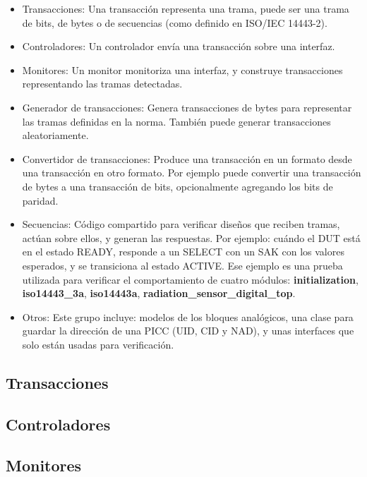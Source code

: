 \documentclass[a4paper, twoside, 11pt]{report}
\begin{document}
\begin{itemize}
  \item Transacciones: Una transacción representa una trama, puede ser una trama de bits, de bytes o de secuencias (como definido en ISO/IEC 14443-2).
  \item Controladores: Un controlador envía una transacción sobre una interfaz.
  \item Monitores: Un monitor monitoriza una interfaz, y construye transacciones representando las tramas detectadas.
  \item Generador de transacciones: Genera transacciones de bytes para representar las tramas definidas en la norma. También puede generar transacciones aleatoriamente.
  \item Convertidor de transacciones: Produce una transacción en un formato desde una transacción en otro formato. Por ejemplo puede convertir una transacción de bytes a una transacción de bits, opcionalmente agregando los bits de paridad.
  \item Secuencias: Código compartido para verificar diseños que reciben tramas, actúan sobre ellos, y generan las respuestas. Por ejemplo: cuándo el DUT está en el estado READY, responde a un SELECT con un SAK con los valores esperados, y se transiciona al estado ACTIVE. Ese ejemplo es una prueba utilizada para verificar el comportamiento de cuatro módulos: \textbf{initialization}, \textbf{iso14443\_3a}, \textbf{iso14443a}, \textbf{radiation\_sensor\_digital\_top}.
  \item Otros: Este grupo incluye: modelos de los bloques analógicos, una clase para guardar la dirección de una PICC (UID, CID y NAD), y unas interfaces que solo están usadas para verificación.
\end{itemize}

\FloatBarrier
\subsection{Transacciones}

\FloatBarrier
\subsection{Controladores}

\FloatBarrier
\subsection{Monitores}
\end{document}

